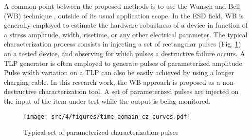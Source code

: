 A common point between the proposed methods is to use the Wunsch and Bell (WB) technique \cite{wunsch-bell}, outside of its usual application scope.
In the ESD field, WB is generally employed to estimate the hardware robustness of a device in function of a stress amplitude, width, risetime, or any other electrical parameter.
The typical characterization process consists in injecting a set of rectangular pulses (Fig. \ref{set_input_signals}) on a tested device, and observing for which pulses a destructive failure occurs.
A TLP generator is often employed to generate pulses of parameterized amplitude.
Pulse width variation on a TLP can also be easily achieved by using a longer charging cable.
In this research work, the WB approach is proposed as a non-destructive characterization tool.
A set of parameterized pulses are injected on the input of the item under test while the output is being monitored.

\begin{figure}[!h]
  \centering
  \texttt{[image: src/4/figures/time\_domain\_cz\_curves.pdf]}
  \caption{Typical set of parameterized characterization pulses}
  \label{set_input_signals}
\end{figure}
